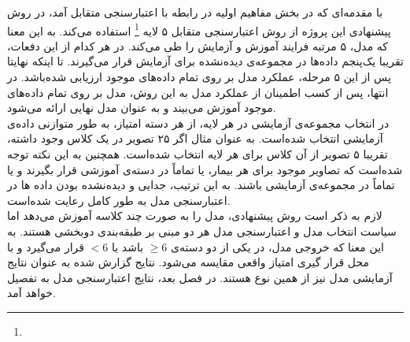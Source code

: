 
با مقدمه‌ای که در بخش مفاهیم اولیه در رابطه با اعتبارسنجی متقابل آمد، در روش پیشنهادی این پروژه از روش اعتبارسنجی متقابل ۵ لایه
\footnote{}
استفاده می‌کند.
به این معنا که مدل، ۵ مرتبه فرایند آموزش و آزمایش را طی می‌کند.
 در هر کدام از این دفعات، تقریبا یک‌پنجم داده‌ها در مجموعه‌ی دیده‌نشده برای آزمایش قرار می‌گیرند.
 تا اینکه نهایتا پس از این ۵ مرحله، عملکرد مدل بر روی تمام داده‌های موجود ارزیابی شده‌باشد.
 در انتها، پس از کسب اطمینان از عملکرد مدل به این روش، مدل بر روی تمام داده‌های موجود آموزش می‌بیند و به عنوان مدل نهایی ارائه می‌شود.\\

در انتخاب مجموعه‌ی آزمایشی در هر لایه، از هر دسته امتیاز، به طور متوازنی داده‌ی آزمایشی انتخاب شده‌است.
به عنوان مثال اگر ۲۵ تصویر در یک کلاس وجود داشته، تقریبا ۵ تصویر از آن کلاس برای هر لایه انتخاب شده‌است.
همچنین به این نکته توجه شده‌است که تصاویر موجود برای هر بیمار، یا تماماً در دسته‌ی آموزشی قرار بگیرند و یا تماماً در مجموعه‌ی آزمایشی باشند.
به این ترتیب، جدایی و  دیده‌نشده بودن داده ها در اعتبارسنجی مدل به طور کامل رعایت شده‌است.\\

لازم به ذکر است
روش پیشنهادی، مدل را به صورت چند کلاسه آموزش می‌دهد اما سیاست انتخاب مدل و اعتبارسنجی مدل هر دو مبنی بر طبقه‌بندی دو‌بخشی هستند.
به این معنا که خروجی مدل، 
در یکی از دو دسته‌ی 
$\geq 6$ باشد یا $< 6$
قرار می‌گیرد و با محل قرار گیری امتیاز واقعی مقایسه می‌شود.
نتایج گزارش شده به عنوان نتایج آزمایشی مدل نیز از همین نوع هستند. 
در فصل بعد، نتایج اعتبارسنجی مدل به تفصیل خواهد آمد.
